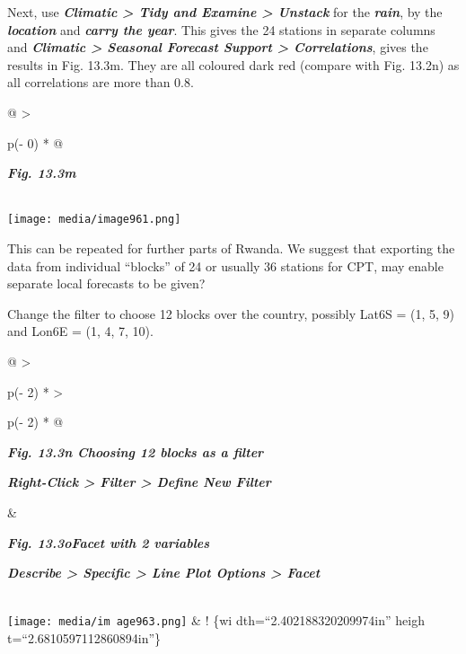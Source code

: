 \documentclass[
  letterpaper,
  DIV=11,
  numbers=noendperiod]{scrreprt}
\begin{document}
Next, use \textbf{\emph{Climatic \textgreater{} Tidy and Examine
\textgreater{} Unstack}} for the \textbf{\emph{rain}}, by the
\textbf{\emph{location}} and \textbf{\emph{carry the year}}. This gives
the 24 stations in separate columns and \textbf{\emph{Climatic
\textgreater{} Seasonal Forecast Support \textgreater{} Correlations}},
gives the results in Fig. 13.3m. They are all coloured dark red (compare
with Fig. 13.2n) as all correlations are more than 0.8.

\begin{longtable}[]{@{}
  >{\raggedright\arraybackslash}p{(\columnwidth - 0\tabcolsep) * }@{}}
\toprule\noalign{}
\begin{minipage}[b]{\linewidth}\raggedright
\textbf{\emph{Fig. 13.3m}}
\end{minipage} \\
\midrule\noalign{}
\endhead
\bottomrule\noalign{}
\endlastfoot
\texttt{[image: media/image961.png]} \\
\end{longtable}

This can be repeated for further parts of Rwanda. We suggest that
exporting the data from individual ``blocks'' of 24 or usually 36
stations for CPT, may enable separate local forecasts to be given?

Change the filter to choose 12 blocks over the country, possibly Lat6S =
(1, 5, 9) and Lon6E = (1, 4, 7, 10).

\begin{longtable}[]{@{}
  >{\raggedright\arraybackslash}p{(\columnwidth - 2\tabcolsep) * }
  >{\raggedright\arraybackslash}p{(\columnwidth - 2\tabcolsep) * }@{}}
\toprule\noalign{}
\begin{minipage}[b]{\linewidth}\raggedright
\textbf{\emph{Fig. 13.3n Choosing 12 blocks as a filter}}

\textbf{\emph{Right-Click \textgreater{} Filter \textgreater{} Define
New Filter}}
\end{minipage} & \begin{minipage}[b]{\linewidth}\raggedright
\textbf{\emph{Fig. 13.3oFacet with 2 variables}}

\textbf{\emph{Describe \textgreater{} Specific \textgreater{} Line Plot
Options \textgreater{} Facet}}
\end{minipage} \\
\midrule\noalign{}
\endhead
\bottomrule\noalign{}
\endlastfoot
\texttt{[image: media/im age963.png]}
& ! \href{media/image979.png}{}\{wi dth=``2.402188320209974in'' heigh
t=``2.6810597112860894in''\} \\
\end{longtable}
\end{document}
